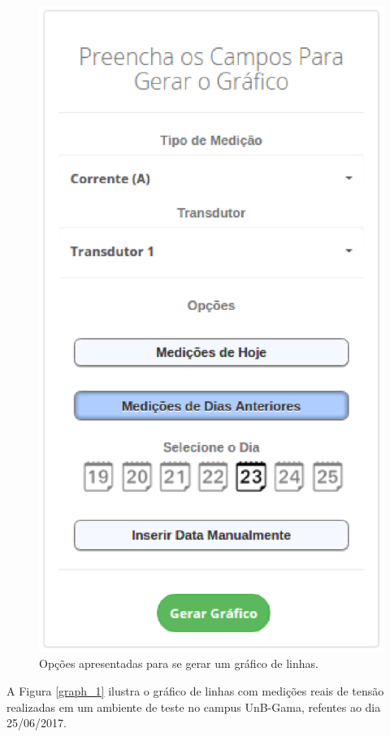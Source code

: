 \begin{figure}[!h]
    \centering
    \includegraphics[keepaspectratio=true, scale=0.5]{figuras/graph_options.eps}
    \caption{Opções apresentadas para se gerar um gráfico de linhas.}
    \label{graph_options}
\end{figure}

A Figura \ref{graph_1} ilustra o gráfico de linhas com medições reais de tensão realizadas em um ambiente de teste no campus UnB-Gama, refentes ao dia 25/06/2017.

